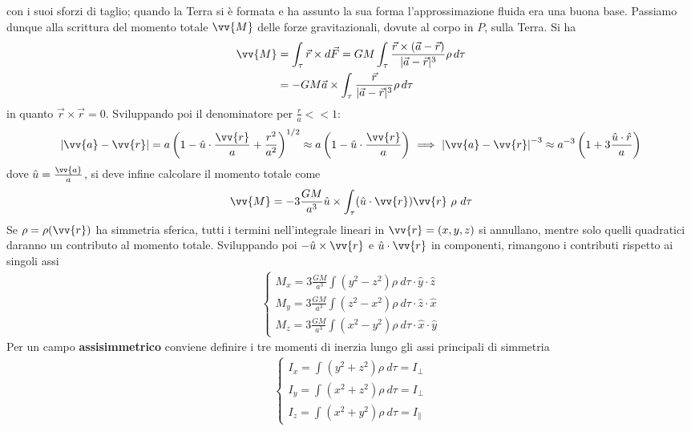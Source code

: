 \documentclass[a4paper, oneside]{book}
\begin{document}
con i suoi sforzi di taglio; quando la Terra si è formata e ha assunto la sua forma l'approssimazione fluida era una buona base. 
Passiamo dunque alla scrittura del momento totale $\vv{M}$ delle forze gravitazionali, dovute al corpo in $P$, sulla Terra.
Si ha
\begin{align*}
\vv{M} &= \int_{\tau} \vec{r} \times d\vec{F} = GM \int_{\tau} \frac{\vec{r} \times (\vec{a} - \vec{r})}{|\vec{a} - \vec{r}|^3} \rho \, d\tau \\
&= -GM \vec{a} \times \int_{\tau} \frac{\vec{r}}{|\vec{a} - \vec{r}|^3} \rho \, d\tau
\end{align*}
in quanto $\vec{r}\times\vec{r}=0$. Sviluppando poi il denominatore per $\frac{r}{a} << 1$: 
\begin{gather*}
    \left| \vv{a} - \vv{r}   \right| = a\left(1 - \hat{u} \cdot \frac{\vv{r} }{a} + \frac{r^{2}}{a^{2}} \right)^{1/2} \approx a\left(1 - \hat{u} \cdot \frac{\vv{r} }{a} \right) \ \Longrightarrow \ \left| \vv{a} -\vv{r}   \right|^{-3} \approx a^{-3} \left(1 + 3\frac{\hat{u} \cdot \hat{r}  }{a}\right)
\end{gather*}
dove $\hat{u} = \frac{\vv{a} }{a}$, si deve infine calcolare il momento totale come
\begin{gather*}
    \vv{M} = - 3\frac{GM}{a^{3}}\hat{u} \times \int_{\tau} (\hat{u} \cdot \vv{r}   )\vv{r} \ \rho \ d\tau  
\end{gather*} 
Se $\rho = \rho(\vv{r} )$ ha simmetria sferica, tutti i termini nell'integrale lineari in 
$\vv{r} = (x, y, z)$ si annullano, mentre solo quelli quadratici daranno un contributo al momento totale. 
Sviluppando poi $-\hat{u} \times \vv{r}$ e $\hat{u} \cdot \vv{r}$ in componenti, rimangono i contributi 
rispetto ai singoli assi
\begin{align}
    \left\{\begin{array}{l}
        \displaystyle M_x = 3\frac{GM}{a^{3}} \int (y^{2} - z^{2})\rho \ d\tau \cdot \hat{y} \cdot \hat{z} \\
        \displaystyle  M_y = 3\frac{GM}{a^{3}} \int (z^{2} - x^{2}) \rho \ d\tau \cdot  \hat{z} \cdot \hat{x} \\
        \displaystyle  M_z = 3\frac{GM}{a^{3}} \int (x^{2} - y^{2})\rho \ d\tau \cdot \hat{x} \cdot \hat{y}  
    \end{array}\right.
\end{align}    
Per un campo \textbf{assisimmetrico} conviene definire i tre momenti di inerzia lungo gli assi 
principali di simmetria 
\begin{align}
    \left\{\begin{array}{l}
        \displaystyle I_x = \int_{}^{} (y^{2} + z^{2})\rho \ d\tau = I_\perp \\
        \displaystyle I_y = \int_{}^{} (x^{2} + z^{2}) \rho \ d\tau = I_\perp \\
        \displaystyle I_z = \int_{}^{}(x^{2} + y^{2})\rho \ d\tau = I_\parallel  
    \end{array}\right.
\end{align}
\end{document}
